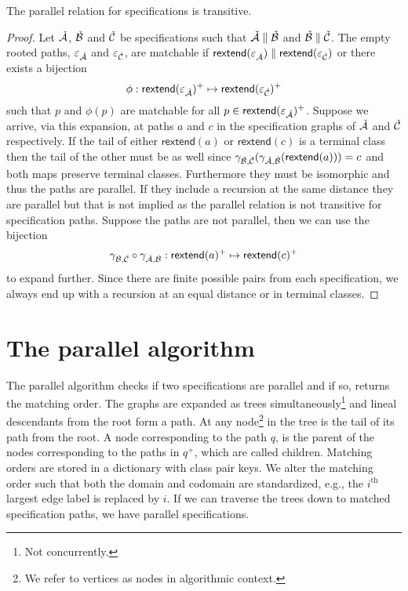 \begin{proposition}
The parallel relation for specifications is transitive.
\end{proposition}
\begin{proof}
Let $\check{\mathcal{A}}$, $\check{\mathcal{B}}$ and $\check{\mathcal{C}}$ be specifications such that $\check{\mathcal{A}} \parallel\check{\mathcal{B}}$ and $\check{\mathcal{B}} \parallel \check{\mathcal{C}}$. The empty rooted paths, $\varepsilon_{\check{\mathcal{A}}}$ and $\varepsilon_{\check{\mathcal{C}}}$, are matchable if $\textsf{rextend}(\varepsilon_{\check{\mathcal{A}}}) \parallel \textsf{rextend}(\varepsilon_{\check{\mathcal{C}}})$ or there exists a bijection
\[
    \phi: \textsf{rextend}(\varepsilon_{\check{\mathcal{A}}})^+ \mapsto \textsf{rextend}(\varepsilon_{\check{\mathcal{C}}})^+
\]
such that $p$ and $\phi(p)$ are matchable for all $p \in \textsf{rextend}(\varepsilon_{\check{\mathcal{A}}})^+$. Suppose we arrive, via this expansion, at paths $a$ and $c$ in the specification graphs of $\check{\mathcal{A}}$ and $\check{\mathcal{C}}$ respectively. If the tail of either $\textsf{rextend}(a)$ or $\textsf{rextend}(c)$ is a terminal class then the tail of the other must be as well since $\gamma_{\check{\mathcal{B}},\check{\mathcal{C}}}(\gamma_{\check{\mathcal{A}},\check{\mathcal{B}}}(\textsf{rextend}(a))) = c$ and both maps preserve terminal classes. Furthermore they must be isomorphic and thus the paths are parallel. If they include a recursion at the same distance they are parallel but that is not implied as the parallel relation is not transitive for specification paths. Suppose the paths are not parallel, then we can use the bijection
\[
    \gamma_{\check{\mathcal{B}},\check{\mathcal{C}}} \circ \gamma_{\check{\mathcal{A}},\check{\mathcal{B}}}: \textsf{rextend}(a)^+ \mapsto \textsf{rextend}(c)^+
\]
to expand further. Since there are finite possible pairs from each specification, we always end up with a recursion at an equal distance or in terminal classes.
\end{proof}



\section{The parallel algorithm}\label{sec:paralg}
The parallel algorithm checks if two specifications are parallel and if so, returns the matching order. The graphs are expanded as trees simultaneously\footnote{Not concurrently.} and lineal descendants from the root form a path. At any node\footnote{We refer to vertices as nodes in algorithmic context.} in the tree is the tail of its path from the root. A node corresponding to the path $q$, is the parent of the nodes corresponding to the paths in $q^+$, which are called children. Matching orders are stored in a dictionary with class pair keys. We alter the matching order such that both the domain and codomain are standardized, e.g., the $i^\text{th}$ largest edge label is replaced by $i$. If we can traverse the trees down to matched specification paths, we have parallel specifications.

